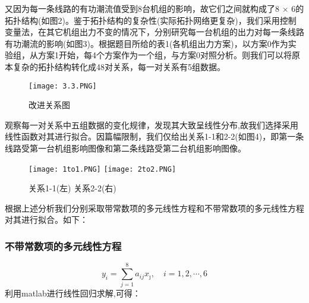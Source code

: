 \documentclass[12pt,a4paper]{ctexart}
\begin{document}
	又因为每一条线路的有功潮流值受到8台机组的影响，故它们之间就构成了8 $\times$ 6的拓扑结构(如图2)。鉴于拓扑结构的复杂性(实际拓扑网络更复杂)，我们采用控制变量法，在其它机组出力不变的情况下，分别研究每一台机组的出力对每一条线路有功潮流的影响(如图3)。根据题目所给的表1(各机组出力方案)，以方案0作为实验组，从方案1开始，每4个方案作为一个组，与方案0对照分析。则我们可以将原本复杂的拓扑结构转化成48对关系，每一对关系有5组数据。
	
	\begin{figure}[!h]
		\centering	%
		\texttt{[image: 3.3.PNG]} %
		\caption{改进关系图}
	\end{figure}
	
	
	观察每一对关系中五组数据的变化规律，发现其大致呈线性分布,故我们选择采用线性函数对其进行拟合。因篇幅限制，我们仅给出关系1-1和2-2(如图4)，即第一条线路受第一台机组影响图像和第二条线路受第二台机组影响图像。
	
	\begin{figure}[!h]
		\centering	%
		\texttt{[image: 1to1.PNG]} %
		\texttt{[image: 2to2.PNG]}
		\caption{关系1-1(左) 关系2-2(右)}
	\end{figure}
	
	根据上述分析我们分别采取带常数项的多元线性方程和不带常数项的多元线性方程对其进行拟合。如下：

	\subsubsection*{不带常数项的多元线性方程}
	\begin{equation} 
		y_{i}=\sum_{j=1}^{8} a_{i j} x_{\jmath}, \quad i=1,2, \cdots, 6
	\end{equation}
	利用matlab进行线性回归求解,可得：
	
\end{document}
